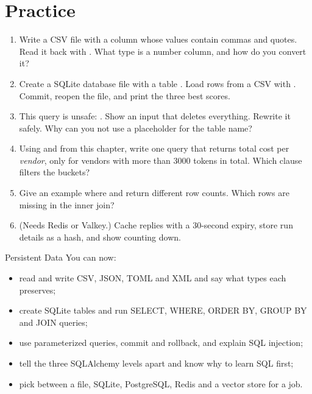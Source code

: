 \section{Practice}

\begin{practice}
\begin{enumerate}[leftmargin=*,itemsep=2pt]
\item Write a CSV file with a column whose values contain commas and quotes. Read it back
  with . What type is a number column, and how do you convert it?
\item Create a SQLite database file with a table .
  Load rows from a CSV with . Commit, reopen the file, and print the
  three best scores.
\item This query is unsafe: .
  Show an input that deletes everything. Rewrite it safely. Why can you not use a
  placeholder for the table name?
\item Using  and  from this chapter, write one query that returns
  total cost per \emph{vendor}, only for vendors with more than 3000 tokens in total.
  Which clause filters the buckets?
\item Give an example where  and  return different row counts.
  Which rows are missing in the inner join?
\item (Needs Redis or Valkey.) Cache replies with a 30-second expiry, store run details as a
  hash, and show  counting down.
\end{enumerate}
\end{practice}

\begin{achievement}{Persistent Data}
You can now:
\begin{itemize}[leftmargin=*,itemsep=1pt]
\item read and write CSV, JSON, TOML and XML and say what types each preserves;
\item create SQLite tables and run SELECT, WHERE, ORDER BY, GROUP BY and JOIN queries;
\item use parameterized queries, commit and rollback, and explain SQL injection;
\item tell the three SQLAlchemy levels apart and know why to learn SQL first;
\item pick between a file, SQLite, PostgreSQL, Redis and a vector store for a job.
\end{itemize}
\end{achievement}
